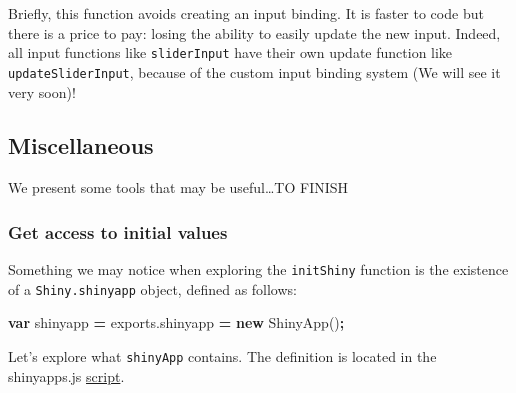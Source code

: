 \documentclass[]{book}
\newenvironment{Shaded}{\begin{snugshade}}{\end{snugshade}}
\newcommand{\AttributeTok}[1]{\textcolor[rgb]{0.77,0.63,0.00}{#1}}
\newcommand{\KeywordTok}[1]{\textcolor[rgb]{0.13,0.29,0.53}{\textbf{#1}}}
\newcommand{\NormalTok}[1]{#1}
\newcommand{\OperatorTok}[1]{\textcolor[rgb]{0.81,0.36,0.00}{\textbf{#1}}}
\newcommand{\VariableTok}[1]{\textcolor[rgb]{0.00,0.00,0.00}{#1}}
\begin{document}
Briefly, this function avoids creating an input binding. It is faster to code but there is a price to pay: losing the ability to easily update the new input. Indeed, all input functions like \texttt{sliderInput} have their own update function like \texttt{updateSliderInput}, because of the custom input binding system (We will see it very soon)!

\hypertarget{miscellaneous}{%
\subsection{Miscellaneous}\label{miscellaneous}}

We present some tools that may be useful\ldots{}TO FINISH

\hypertarget{get-access-to-initial-values}{%
\subsubsection{Get access to initial values}\label{get-access-to-initial-values}}

Something we may notice when exploring the \texttt{initShiny} function is the existence of a \texttt{Shiny.shinyapp} object, defined as follows:

\begin{Shaded}
\begin{Highlighting}[]
\KeywordTok{var}\NormalTok{ shinyapp }\OperatorTok{=} \VariableTok{exports}\NormalTok{.}\AttributeTok{shinyapp} \OperatorTok{=} \KeywordTok{new} \AttributeTok{ShinyApp}\NormalTok{()}\OperatorTok{;}
\end{Highlighting}
\end{Shaded}

Let's explore what \texttt{shinyApp} contains. The definition is located in the shinyapps.js \href{https://github.com/rstudio/shiny/blob/master/srcjs/shinyapp.js}{script}.
\end{document}
